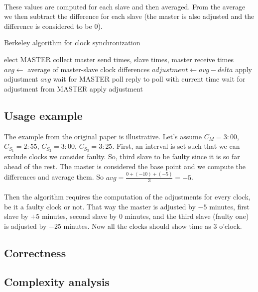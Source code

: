 \documentclass[12pt]{article}
\begin{document}
\paragraph{}
These values are computed for each slave and then averaged. From the average we then subtract the difference for each slave (the master is also adjusted and the difference is considered to be 0).

\begin{algorithm}
\caption{Berkeley algorithm for clock synchronization}
\begin{algorithmic}[1]
	\State elect MASTER
		\State collect master send times, slave times, master receive times
		\State $avg \gets $ average of master-slave clock differences
		\State $adjustment \gets avg-delta$
		\State apply adjustment $avg$
		\State wait for MASTER poll
		\State reply to poll with current time
		\State wait for adjustment from MASTER
		\State apply adjustment
	\EndIf
\end{algorithmic}
\end{algorithm}

\subsection{Usage example}
The example from the original paper is illustrative. Let's assume $C_{M} = 3:00$, $C_{S_{1}} = 2:55$, $C_{S_{2}} = 3:00$, $C_{S_{3}} = 3:25$. First, an interval is set such that we can exclude clocks we consider faulty. So, third slave to be faulty since it is so far ahead of the rest. The master is considered the base point and we compute the differences and average them. So $avg=\frac{0 + (-10) + (-5)}{3} = -5$. 

\paragraph{}
Then the algorithm requires the computation of the adjustments for every clock, be it a faulty clock or not. That way the master is adjusted by $-5$ minutes, first slave by $+5$ minutes, second slave by $0$ minutes, and the third slave (faulty one) is adjusted by $-25$ minutes. Now all the clocks should show time as 3 o'clock.

\subsection{Correctness}

\subsection{Complexity analysis}
\end{document}
